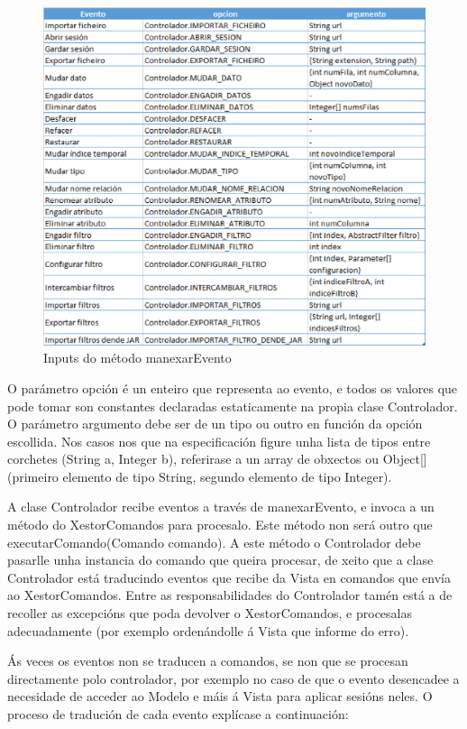 \begin{figure}
\centering
\includegraphics[width=\textwidth,height=\textheight,keepaspectratio]{figuras/manexarEvento}
\caption{Inputs do método manexarEvento}
\label{manexarEvento}
\end{figure}

O parámetro opción é un enteiro que representa ao evento, e todos os valores que pode tomar son constantes declaradas estaticamente na propia clase Controlador. O parámetro argumento debe ser de un tipo ou outro en función da opción escollida. Nos casos nos que na especificación figure unha lista de tipos entre corchetes ({String a, Integer b}), referirase a un array de obxectos ou Object[] (primeiro elemento de tipo String, segundo elemento de tipo Integer).

A clase Controlador recibe eventos a través de manexarEvento, e invoca a un método do XestorComandos para procesalo. Este método non será outro que executarComando(Comando comando). A este método o Controlador debe pasarlle unha instancia do comando que queira procesar, de xeito que a clase Controlador está traducindo eventos que recibe da Vista en comandos que envía ao XestorComandos. Entre as responsabilidades do Controlador tamén está a de recoller as excepcións que poda devolver o XestorComandos, e procesalas adecuadamente (por exemplo ordenándolle á Vista que informe do erro).

Ás veces os eventos non se traducen a comandos, se non que se procesan directamente polo controlador, por exemplo no caso de que o evento desencadee a necesidade de acceder ao Modelo e máis á Vista para aplicar sesións neles. O proceso de tradución de cada evento explícase a continuación:


